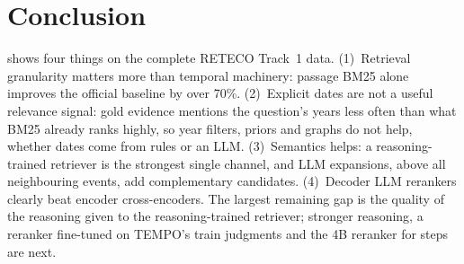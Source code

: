 \section{Conclusion}
\label{sec:conclusion}

\sys shows four things on the complete RETECO Track~1 data. (1)~Retrieval granularity matters
more than temporal machinery: passage BM25 alone improves the official baseline by over 70\%.
(2)~Explicit dates are not a useful relevance signal: gold evidence mentions the question's years
less often than what BM25 already ranks highly, so year filters, priors and graphs do not help,
whether dates come from rules or an LLM. (3)~Semantics helps: a reasoning-trained retriever is
the strongest single channel, and LLM expansions, above all neighbouring events, add complementary
candidates. (4)~Decoder LLM rerankers clearly beat encoder cross-encoders. The largest remaining
gap is the quality of the reasoning given to the reasoning-trained retriever; stronger reasoning,
a reranker fine-tuned on TEMPO's train judgments and the 4B reranker for steps are next.

